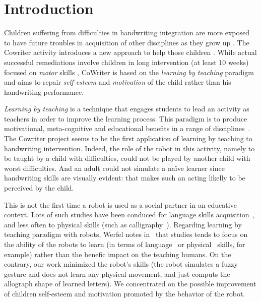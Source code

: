 \documentclass{sig-alternate}
\begin{document}

\section{Introduction}

Children suffering from difficulties in handwriting integration are more exposed
to have future troubles in acquisition of other disciplines as they grow up
\cite{Christensen2005}. 
The Cowriter activity introduces a new approach to help those children
\cite{Hood}. While actual successful remediations involve children
in long intervention (at least 10 weeks) focused on \emph{motor} skills \cite{Hoy2011},
CoWriter is based on the \emph{learning by teaching} paradigm and aims to repair
\emph{self-esteem} and \emph{motivation} of the child rather than his
handwriting performance.

\emph{Learning by teaching} is a technique that engages students to lead an
activity as teachers in order to improve the learning process. This paradigm is to produce
motivational, meta-cognitive and educational benefits in a range of
disciplines~\cite{Rohrbeck2003i}. The Cowriter project seems to be the first
application of learning by teaching to handwriting intervention. Indeed, the
role of the robot in this activity, namely to be taught by a child with
difficulties, could not be played by another child with worst difficulties. And
an adult could not simulate a naïve learner since handwriting skills are
visually evident: that makes such an acting likelly to be perceived by the
child.

This is not the first time a robot is used as a social partner in an educative
context. Lots of such studies have been conduced for language skills
acquisition~\cite{han2010robot}, and less often to physical skills (such as
calligraphy~\cite{Matsui2013}). Regarding learning by teaching paradigm with
robots, Werfel notes in~\cite{Werfel2014} that studies tends to focus on the
ability of the robots to learn (in terms of language~\cite{Saunders2010} or
physical~\cite{Mulling2013} skills, for example) rather than the benefic impact
on the teaching humans. On the contrary, our work minimized the robot's skills
(the robot simulates a fuzzy gesture and does not learn any physical
movement, and just computs the allograph shape of learned letters). We
concentrated on the possible improvement of children self-esteem and
motivation promoted by the behavior of the robot.
\end{document}
